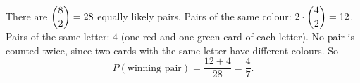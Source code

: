 There are $\dbinom{8}{2}=28$ equally likely pairs. Pairs of the same colour: $2\cdot\dbinom{4}{2}=12$. Pairs of the same letter: $4$ (one red and one green card of each letter). No pair is counted twice, since two cards with the same letter have different colours. So
\[
P(\text{winning pair})=\dfrac{12+4}{28}=\boxed{\dfrac{4}{7}} .
\]
